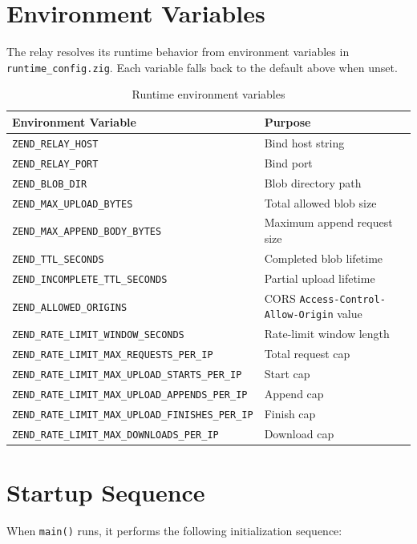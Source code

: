 \documentclass[11pt,a4paper]{report}
\begin{document}
\section{Environment Variables}

The relay resolves its runtime behavior from environment variables in \texttt{runtime\_config.zig}. Each variable falls back to the default above when unset.

\begin{table}[H]
\centering
\begin{tabular}{ll}
\toprule
\textbf{Environment Variable} & \textbf{Purpose} \\
\midrule
\texttt{ZEND\_RELAY\_HOST} & Bind host string \\
\texttt{ZEND\_RELAY\_PORT} & Bind port \\
\texttt{ZEND\_BLOB\_DIR} & Blob directory path \\
\texttt{ZEND\_MAX\_UPLOAD\_BYTES} & Total allowed blob size \\
\texttt{ZEND\_MAX\_APPEND\_BODY\_BYTES} & Maximum append request size \\
\texttt{ZEND\_TTL\_SECONDS} & Completed blob lifetime \\
\texttt{ZEND\_INCOMPLETE\_TTL\_SECONDS} & Partial upload lifetime \\
\texttt{ZEND\_ALLOWED\_ORIGINS} & CORS \texttt{Access-Control-Allow-Origin} value \\
\texttt{ZEND\_RATE\_LIMIT\_WINDOW\_SECONDS} & Rate-limit window length \\
\texttt{ZEND\_RATE\_LIMIT\_MAX\_REQUESTS\_PER\_IP} & Total request cap \\
\texttt{ZEND\_RATE\_LIMIT\_MAX\_UPLOAD\_STARTS\_PER\_IP} & Start cap \\
\texttt{ZEND\_RATE\_LIMIT\_MAX\_UPLOAD\_APPENDS\_PER\_IP} & Append cap \\
\texttt{ZEND\_RATE\_LIMIT\_MAX\_UPLOAD\_FINISHES\_PER\_IP} & Finish cap \\
\texttt{ZEND\_RATE\_LIMIT\_MAX\_DOWNLOADS\_PER\_IP} & Download cap \\
\bottomrule
\end{tabular}
\caption{Runtime environment variables}
\end{table}

\section{Startup Sequence}

When \texttt{main()} runs, it performs the following initialization sequence:
\end{document}
